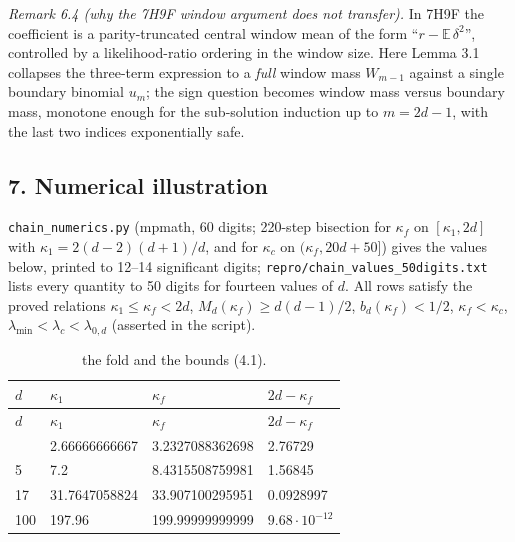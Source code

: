 \documentclass[
  11pt,
  a4paper,
]{article}
\begin{document}
\emph{Remark 6.4 (why the 7H9F window argument does not transfer).} In
7H9F the coefficient is a parity-truncated central window mean of the
form ``\(r-\mathbb E\,\allowbreak{}\delta^2\)'', controlled by a likelihood-ratio
ordering in the window size. Here Lemma 3.1 collapses the three-term
expression to a \emph{full} window mass \(W_{m-1}\) against a single
boundary binomial \(u_m\); the sign question becomes window mass versus
boundary mass, monotone enough for the sub-solution induction up to
\(m=2d-1\), with the last two indices exponentially safe.

\subsection{7. Numerical illustration}\label{numerical-illustration}

{\small\texttt{chain\_\allowbreak{}numerics.\allowbreak{}py}} (mpmath, 60 digits; 220-step bisection for
\(\kappa_f\) on \([\kappa_1,\allowbreak{}2d]\) with \(\kappa_1=2(d-2)(d+1)/d\), and
for \(\kappa_c\) on \((\kappa_f,\allowbreak{}20d+50]\)) gives the values below,
printed to 12--14 significant digits;
{\small\texttt{repro/\allowbreak{}chain\_\allowbreak{}values\_\allowbreak{}50digits.\allowbreak{}txt}} lists every quantity to 50
digits for fourteen values of \(d\). All rows satisfy the proved
relations \(\kappa_1\le\kappa_f<2d\), \(M_d(\kappa_f)\ge d(d-1)/2\),
\(b_d(\kappa_f)<1/2\), \(\kappa_f<\kappa_c\),
\(\lambda_{\min}<\lambda_c<\lambda_{0,\allowbreak{}d}\) (asserted in the script).

\begin{longtable}[]{@{}llll@{}}
\caption{the fold and the bounds (4.1).}\tabularnewline
\toprule\noalign{}
\(d\) & \(\kappa_1\) & \(\kappa_f\) & \(2d-\kappa_f\) \\
\midrule\noalign{}
\endfirsthead
\toprule\noalign{}
\(d\) & \(\kappa_1\) & \(\kappa_f\) & \(2d-\kappa_f\) \\
\midrule\noalign{}
\endhead
\bottomrule\noalign{}
\endlastfoot
3 & 2.66666666667 & 3.2327088362698 & 2.76729 \\
5 & 7.2 & 8.4315508759981 & 1.56845 \\
17 & 31.7647058824 & 33.907100295951 & 0.0928997 \\
100 & 197.96 & 199.99999999999 & \(9.68\cdot10^{-12}\) \\
\end{longtable}
\end{document}
